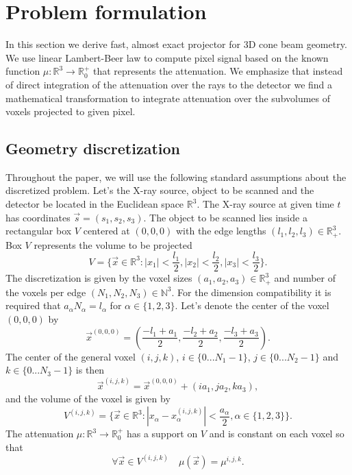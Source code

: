 \section{Problem formulation}
\label{sec:formulation}
In this section we derive fast, almost exact projector for 3D cone beam geometry. We use linear Lambert-Beer law to compute pixel signal based on the known function $\mu : \mathbb{R}^3 \to \mathbb{R}^+_0 $ that represents the attenuation. We emphasize that instead of direct integration of the attenuation over the rays to the detector we find a mathematical transformation to integrate attenuation over the subvolumes of voxels projected to given pixel.

\subsection{Geometry discretization}
Throughout the paper, we will use the following standard assumptions about the discretized problem. Let's the X-ray source, object to be scanned and the detector be located in the Euclidean space $\mathbb{R}^3$. The X-ray source at given time $t$ has coordinates  $\vec{s} = (s_1, s_2, s_3)$. The object to be scanned lies inside a rectangular box $V$ centered at $(0,0,0)$ with the edge lengths $(l_1, l_2, l_3) \in \mathbb{R}_{+}^3$. Box $V$ represents the volume to be projected
\begin{equation}
    V = \{ \vec{x} \in \mathbb{R}^3 : |x_1| < \frac{l_1}{2},|x_2| < \frac{l_2}{2}, |x_3| < \frac{l_3}{2} \}.
    \nonumber
\end{equation}
The discretization is given by the voxel sizes $(a_1,a_2,a_3) \in \mathbb{R}_{+}^3$ and number of the voxels per edge $(N_1, N_2, N_3) \in \mathbb{N}^3$. For the dimension compatibility it is required that $a_\alpha N_\alpha = l_\alpha$ for $\alpha \in \{1,2,3\}$. Let's denote the center of the voxel $(0,0,0)$ by 
\begin{equation}
    \vec{x}^{(0,0,0)} =  (\frac{-l_1 + a_1}{2}, \frac{-l_2 + a_2}{2}, \frac{-l_3+a_3}{2}).
    \nonumber
\end{equation}
The center of the general voxel $(i,j,k)$,  $i\in \{0...N_1-1\}$, $j\in \{0...N_2-1\}$ and $k\in \{0...N_3-1\}$ is then
\begin{equation}
    \vec{x}^{(i,j,k)} = \vec{x}^{(0,0,0)} +  (i a_1, j a_2, k a_3),
    \nonumber
\end{equation}
and the volume of the voxel is given by
\begin{equation}
V^{(i,j,k)} = \{ \vec{x} \in \mathbb{R}^3 : |x_\alpha-x^{(i,j,k)}_\alpha| < \frac{a_\alpha}{2}, \alpha \in \{1,2,3\} \}.
\nonumber
\end{equation}
The attenuation $\mu : \mathbb{R}^3 \to \mathbb{R}^+_0 $  has a support on $V$ and is constant on each voxel so that
\begin{equation}
\forall \vec{x} \in V^{(i,j,k)} \quad \mu(\vec{x}) = \mu^{i,j,k}.
\nonumber
\end{equation}

